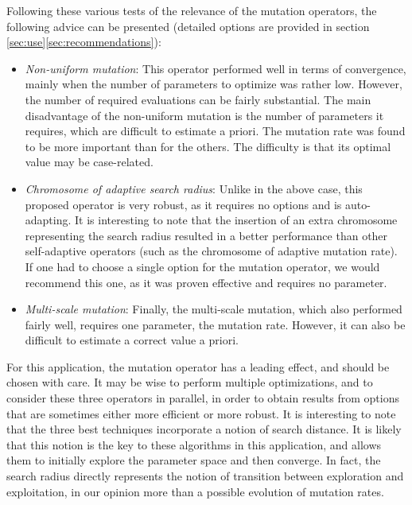\documentclass{ametsoc}
\begin{document}
Following these various tests of the relevance of the mutation operators, the following advice can be presented (detailed options are provided in section \ref{sec:use}\ref{sec:recommendations}):

\begin{itemize}
	
	\item \textit{Non-uniform mutation}: This operator performed well in terms of convergence, mainly when the number of parameters to optimize was rather low. However, the number of required evaluations can be fairly substantial. The main disadvantage of the non-uniform mutation is the number of parameters it requires, which are difficult to estimate a priori. The mutation rate was found to be more important than for the others. The difficulty is that its optimal value may be case-related.
	
	\item \textit{Chromosome of adaptive search radius}: Unlike in the above case, this proposed operator is very robust, as it requires no options and is auto-adapting. It is interesting to note that the insertion of an extra chromosome representing the search radius resulted in a better performance than other self-adaptive operators (such as the chromosome of adaptive mutation rate). If one had to choose a single option for the mutation operator, we would recommend this one, as it was proven effective and requires no parameter.
	
	\item \textit{Multi-scale mutation}: Finally, the multi-scale mutation, which also performed fairly well, requires one parameter, the mutation rate. However, it can also be difficult to estimate a correct value a priori.
	
\end{itemize}

For this application, the mutation operator has a leading effect, and should be chosen with care. It may be wise to perform multiple optimizations, and to consider these three operators in parallel, in order to obtain results from options that are sometimes either more efficient or more robust. It is interesting to note that the three best techniques incorporate a notion of search distance. It is likely that this notion is the key to these algorithms in this application, and allows them to initially explore the parameter space and then converge. In fact, the search radius directly represents the notion of transition between exploration and exploitation, in our opinion more than a possible evolution of mutation rates.
\end{document}
